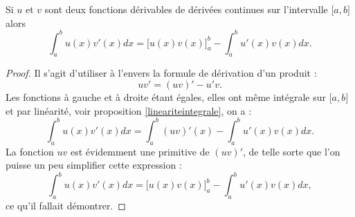 \begin{proposition}
    Si \( u\) et \( v\) sont deux fonctions dérivables de dérivées continues sur l'intervalle \( \mathopen[ a , b \mathclose]\) alors
    \begin{equation}        \label{EQooKISBooQvGMQT}
        \int_a^b u(x)v'(x)dx=\big[ u(x)v(x) \big]_a^b-\int_a^bu'(x)v(x)dx.
    \end{equation}
\end{proposition}

\begin{proof}
    Il s'agit d'utiliser à l'envers la formule de dérivation d'un produit :
    \begin{equation}
        uv'=(uv)'-u'v.
    \end{equation}
    Les fonctions à gauche et à droite étant égales, elles ont même intégrale sur \( \mathopen[ a , b \mathclose]\) et par linéarité, voir  proposition \ref{lineariteintegrale}, on a :
    \begin{equation}
        \int_a^b u(x)v'(x)dx=\int_a^b (uv)'(x)-\int_a^b u'(x)v(x)dx.
    \end{equation}
    La fonction \( uv\) est évidemment une primitive de \( (uv)'\), de telle sorte que l'on puisse un peu simplifier cette expression :
    \begin{equation}
        \int_a^b u(x)v'(x)dx= \Big[ u(x)v(x) \Big]_a^b -\int_a^b u'(x)v(x)dx,
    \end{equation}
    ce qu'il fallait démontrer.
\end{proof}

